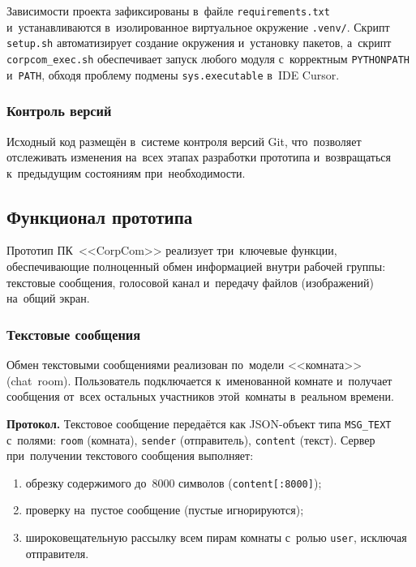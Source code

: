 Зависимости проекта зафиксированы в~файле \texttt{requirements.txt} и~устанавливаются в~изолированное виртуальное окружение \texttt{.venv/}. Скрипт \texttt{setup.sh} автоматизирует создание окружения и~установку пакетов, а~скрипт \texttt{corpcom\_exec.sh} обеспечивает запуск любого модуля с~корректным \texttt{PYTHONPATH} и~\texttt{PATH}, обходя проблему подмены \texttt{sys.executable} в~IDE Cursor.

\subsubsection{Контроль версий}

Исходный код размещён в~системе контроля версий Git, что~позволяет отслеживать изменения на~всех этапах разработки прототипа и~возвращаться к~предыдущим состояниям при~необходимости.

\subsection{Функционал прототипа}

Прототип ПК~<<CorpCom>> реализует три~ключевые функции, обеспечивающие полноценный обмен информацией внутри рабочей группы: текстовые сообщения, голосовой канал и~передачу файлов (изображений) на~общий экран.

\subsubsection{Текстовые сообщения}

Обмен текстовыми сообщениями реализован по~модели <<комната>> (chat~room). Пользователь подключается к~именованной комнате и~получает сообщения от~всех остальных участников этой~комнаты в~реальном времени.

\textbf{Протокол.} Текстовое сообщение передаётся как JSON-объект типа \texttt{MSG\_TEXT} с~полями: \texttt{room} (комната), \texttt{sender} (отправитель), \texttt{content} (текст). Сервер при~получении текстового сообщения выполняет:

\begin{enumerate}
  \item обрезку содержимого до~8000 символов (\texttt{content[:8000]});
  \item проверку на~пустое сообщение (пустые игнорируются);
  \item широковещательную рассылку всем пирам комнаты с~ролью \texttt{user}, исключая отправителя.
\end{enumerate}

